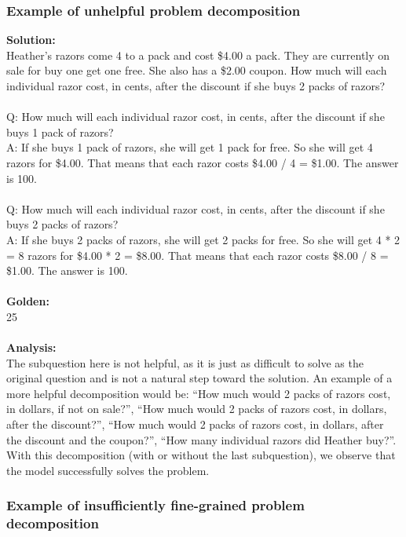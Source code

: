 \subsubsection{Example of unhelpful problem decomposition}

\textbf{Solution:} \\
Heather's razors come 4 to a pack and cost \$4.00 a pack.  They are currently on sale for buy one get one free.  She also has a \$2.00 coupon.  How much will each individual razor cost, in cents, after the discount if she buys 2 packs of razors? \\
 \\
Q: How much will each individual razor cost, in cents, after the discount if she buys 1 pack of razors? \\
A: If she buys 1 pack of razors, she will get 1 pack for free. So she will get 4 razors for \$4.00. That means that each razor costs \$4.00 / 4 = \$1.00. The answer is 100. \\
 \\
Q: How much will each individual razor cost, in cents, after the discount if she buys 2 packs of razors? \\
A: If she buys 2 packs of razors, she will get 2 packs for free. So she will get 4 * 2 = 8 razors for \$4.00 * 2 = \$8.00. That means that each razor costs \$8.00 / 8 = \$1.00. The answer is 100. \\
 \\
\textbf{Golden:} \\
25 \\
 \\
\textbf{Analysis:} \\
The subquestion here is not helpful, as it is just as difficult to solve as the original question and is not a natural step toward the solution. An example of a more helpful decomposition would be: ``How much would 2 packs of razors cost, in dollars, if not on sale?'', ``How much would 2 packs of razors cost, in dollars, after the discount?'', ``How much would 2 packs of razors cost, in dollars, after the discount and the coupon?'',  ``How many individual razors did Heather buy?''. With this decomposition (with or without the last subquestion), we observe that the model successfully solves the problem.

\subsubsection{Example of insufficiently fine-grained problem decomposition}

